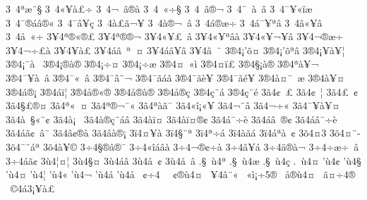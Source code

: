{3^^a04^^aa^^e6^^a8^^a7
3^^a04^^ab^^a5^^e0^^a3^^f7
3^^a04^^ac^^a0^^e2^^ae^^e0
3^^a04^^ad^^a0^^ab^^f7^^a7
3^^a04^^ad^^a0^^e2^^ae^^ac
3^^a04^^af^^a0^^e0^^a0^^e2
3^^a04^^af^^a5^^ab^^ef^^e6
3^^a04^^af^^ae^^e1^^e2^^ae^^ab
3^^a04^^af^^e2^^a5^^e7
3^^a04^^e0^^a3^^e3^^ac^^a5^^ad
3^^a04^^e0^^ae^^ac^^a0^^e2
3^^a04^^e1^^ae^^e6^^f7
3^^a04^^e1^^af^^a5^^aa^^e2
3^^a04^^e2^^ab^^a5^^e2
3^^a04^^e5^^a0^^ab^^f7
3^^a54^^aa^^ae^^ab^^ae^^a3
3^^a54^^aa^^ae^^ad^^ae^^ac
3^^a54^^ab^^a5^^a3^^a0^^ad^^e2
3^^a54^^ab^^a5^^aa^^e2^^e0
3^^a54^^ab^^a5^^ac^^a5^^ad^^e2
3^^a54^^ac^^ae^^e6^^f7
3^^a54^^ac^^f7^^a3^^e0
3^^a54^^ad^^a5^^e0^^a3
3^^a54^^e1^^e2^^a0^^aa^^a0^^a4
3^^a54^^e1^^e2^^a5^^e2
3^^a54^^e2^^a0^^af
3^^ae4^^a1'^^f5^^a4^^ad
3^^ae4^^a1'^^f5^^aa^^e2
3^^ae4^^a1^^a5^^e0^^a5^^a6
3^^ae4^^a1^^a8^^e0^^a0
3^^ae4^^a1^^ae^^e0^^ae^^ad
3^^ae4^^a1^^f7^^a4
3^^ae4^^a1^^f7^^e6
3^^ae4^^a4^^a0^^ab^^ec  
3^^ae4^^a4^^ef^^a3
3^^ae4^^a7^^a1^^e0^^ae
3^^ae4^^aa^^e0^^a5^^ac
3^^ae4^^af^^a5^^e0^^a0^^e2
3^^ae4^^af^^ab^^a0^^e2
3^^ae4^^af^^e2^^a8^^ac
3^^ae4^^af^^e3^^e1^^e2
3^^ae4^^af^^e3^^e8^^a5
3^^ae4^^af^^e3^^e9^^a5
3^^ae4^^e0^^a4^^a8^^ad^^a0^^e6
3^^ae4^^e0^^a5^^ad^^a4
3^^ae4^^e1^^ae^^a1
3^^ae4^^e1^^ef^^a6^^ad
3^^ae4^^e5^^ae^^ab^^ae
3^^ae4^^e5^^ae^^e0^^ae^^ad
3^^ae4^^e5^^ae^^e7
3^^ae4^^e7^^a8^^e1^^ad
3^^ae4^^e7^^a8^^e9
3^^e34^^a2^^a0^^a3
3^^e34^^a2^^a0^^a6
3^^e34^^a3^^a0^^a2
3^^e34^^a7^^a3^^ae^^a4
3^^e34^^aa^^ab^^a0^^a4
3^^e34^^aa^^ae^^ac^^af^^ab
3^^e34^^aa^^e0^^e3^^af^^ad
3^^e34^^ab^^ee^^a1^^ab^^a5^^ad
3^^e34^^ac^^a8^^e2
3^^e34^^ac^^f7^^ab
3^^e34^^af^^a5^^e0^^a5^^a4
3^^e34^^e0^^a0^^a7^^ab^^a8^^a2
3^^e34^^e0^^a1^^a0^^ad
3^^e34^^e0^^ae^^e7^^a8^^e1^^e2
3^^e34^^e0^^ef^^a4
3^^e34^^e0^^ef^^a4^^ae^^a2
3^^e34^^e1^^af^^f7^^e8
3^^e34^^e1^^e2^^a0^^ad^^ae^^a2
3^^e34^^e1^^e2^^af^^f7^^e8
3^^e34^^e1^^e3^^a2^^a0^^e2^^a8
3^^e34^^e2^^a2^^ae^^e0
3^^e34^^e2^^e0^^ae^^a1^^ad
3^^ef4^^a4^^a5^^e0^^ad
3^^ef4^^a7^^a8^^aa
3^^ef4^^aa^^f7^^e1
3^^ef4^^e0^^e3^^e1
3^^ef4^^e1^^aa^^e0^^a0^^a2
3^^f54^^a43^^ad
3^^f54^^a4^^a8^^ad
3^^f54^^af^^a8^^e1^^aa
3^^f54^^e0^^a5^^a9
3^^f74^^a7^^ae^^e2^^ae^^af
3^^f74^^ab^^ee^^e1^^e2^^e0
3^^f74^^ac^^ae^^a2^^f7^^e0
3^^f74^^ad^^e2^^a5^^ad^^e1
3^^f74^^ad^^e4^^ae^^e0^^ac
3^^f74^^ad^^f7^^e6^^f7^^a0^^e2
3^^f74^^e1^^ad^^e3^^a2
3^^f94^^a6^^a4^^a6
3^^f94^^a7^^a4
3^^f94^^e1^^e2
3^^f94^^e5^^a0^^a2
3^^f94^^e5^^a0^^e2
.^^a7^^a0^^f94^^aa
.^^a7^^a0^^f94^^e6
.^^a7^^a0^^f94^^e7
.^^ad^^a0^^f94^^a4
'^^f94^^a2
'^^f94^^a7
'^^f94^^a4
'^^f94^^a6
'^^f94^^ab
'^^f94^^ac
'^^f94^^e1
'^^f94^^e5
^^a0^^a2^^f74^^a0
^^a0^^a2^^ae^^f94^^a4
^^a0^^a54^^e2^^a8^^ab
^^a0^^ab^^ec^^a1^^f75^^ae^^ad
^^a0^^e5^^ae^^f94^^a4
^^a0^^e3^^a4^^f74^^ae
^^a0^^a94^^e13^^a1^^a5^^e0^^a3
}
